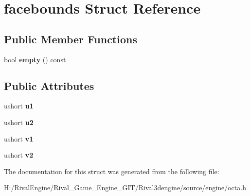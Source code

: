 \hypertarget{structfacebounds}{}\section{facebounds Struct Reference}
\label{structfacebounds}
\subsection*{Public Member Functions}
\begin{DoxyCompactItemize}
\item 
\mbox{\label{structfacebounds_a2559fdb02a2c7d95a2a8b41bc371da9b}} 
bool {\bfseries empty} () const
\end{DoxyCompactItemize}
\subsection*{Public Attributes}
\begin{DoxyCompactItemize}
\item 
\mbox{\label{structfacebounds_a2822bc508bbd5c2faedbdb80454189c9}} 
ushort {\bfseries u1}
\item 
\mbox{\label{structfacebounds_a8d7a70867d20717aac1837e6526bda5b}} 
ushort {\bfseries u2}
\item 
\mbox{\label{structfacebounds_af351c284ab1d1c9058b85e1ebcbad0a6}} 
ushort {\bfseries v1}
\item 
\mbox{\label{structfacebounds_af927adeeadafdf15bd17c3e298b24a3f}} 
ushort {\bfseries v2}
\end{DoxyCompactItemize}


The documentation for this struct was generated from the following file\+:\begin{DoxyCompactItemize}
\item 
H\+:/\+Rival\+Engine/\+Rival\+\_\+\+Game\+\_\+\+Engine\+\_\+\+G\+I\+T/\+Rival3dengine/source/engine/octa.\+h\end{DoxyCompactItemize}
